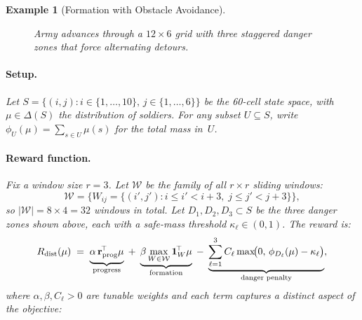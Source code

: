 \documentclass{article}
\newtheorem{example}{Example}
\begin{document}
\begin{example}[Formation with Obstacle Avoidance]
\begin{figure}[h]

\caption{Army advances through a $12\!\times\!6$ grid with three staggered
danger zones that force alternating detours.
}
\label{fig:army-formation}
\end{figure}


\paragraph{Setup.}
Let $S=\{(i,j): i\in\{1,\ldots,10\},\,j\in\{1,\ldots,6\}\}$ be the
60-cell state space, with $\mu\in\Delta(S)$ the distribution of soldiers.
For any subset $U\subseteq S$, write
$\phi_U(\mu)=\sum_{s\in U}\mu(s)$ for the total mass in~$U$.

\paragraph{Reward function.}
Fix a window size $r=3$. Let $\mathcal{W}$ be the family of all
$r\!\times\!r$ sliding windows:
\[
  \mathcal{W}
  = \bigl\{
      W_{ij} = \{(i',j') : i \le i' < i{+}3,\; j \le j' < j{+}3\}
    \bigr\},
\]
so $|\mathcal{W}| = 8\times4 = 32$ windows in total.
Let $D_1,D_2,D_3\subset S$ be the three danger zones shown above,
each with a safe-mass threshold $\kappa_\ell\in(0,1)$.
The reward is:
\begin{equation}\label{eq:army-reward}
  R_{\mathrm{dist}}(\mu)
  \;=\;
  \underbrace{\alpha\,\mathbf{r}_{\mathrm{prog}}^{\!\top}\mu\vphantom{\sum}}_{\text{progress}}
  \;+\;
  \underbrace{\beta \max_{W\in\mathcal{W}}\mathbf{1}_{W}^{\!\top}\mu}_{\text{formation}}
  \;-\;
  \underbrace{\sum_{\ell=1}^{3}C_\ell
    \max\!\bigl(0,\,\phi_{D_\ell}(\mu)-\kappa_\ell\bigr)}_{\text{danger penalty}},
\end{equation}
where $\alpha,\beta,C_\ell>0$ are tunable weights and each term captures
a distinct aspect of the objective:


\end{example}
\end{document}
